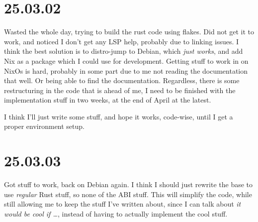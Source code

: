 \section{25.03.02}

Wasted the whole day, trying to build the rust code using flakes. Did not get it
to work, and noticed I don't get any LSP help, probably due to linking issues. I
think the best solution is to distro-jump to Debian, which \textit{just works},
and add Nix as a package which I could use for development. Getting stuff to
work in on NixOs is hard, probably in some part due to me not reading the
documentation that well. Or being able to find the documentation.
Regardless, there is some restructuring in the code that is ahead of me, I need
to be finished with the implementation stuff in two weeks, at the end of April
at the latest.

I think I'll just write some stuff, and hope it works, code-wise, until I get a
proper environment setup.

\section{25.03.03}

Got stuff to work, back on Debian again. I think I should just rewrite the base
to use \textit{regular} Rust stuff, so none of the ABI stuff. This will simplify
the code, while still allowing me to keep the stuff I've written about, since I
can talk about \textit{it would be cool if \dots}, instead of having to actually
implement the cool stuff.
